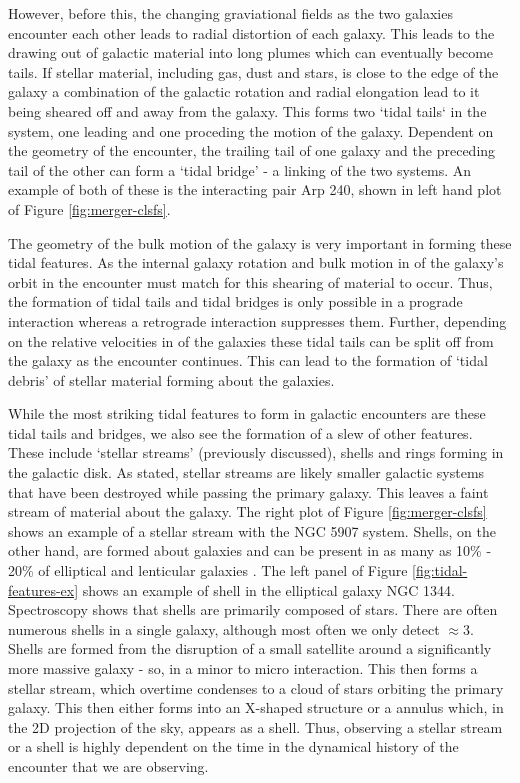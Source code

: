 However, before this, the changing graviational fields as the two galaxies encounter each other leads to radial distortion of each galaxy. This leads to the drawing out of galactic material into long plumes which can eventually become tails. If stellar material, including gas, dust and stars, is close to the edge of the galaxy a combination of the galactic rotation and radial elongation lead to it being sheared off and away from the galaxy. This forms two `tidal tails` in the system, one leading and one proceding the motion of the galaxy. Dependent on the geometry of the encounter, the trailing tail of one galaxy and the preceding tail of the other can form a `tidal bridge' - a linking of the two systems. An example of both of these is the interacting pair Arp 240, shown in left hand plot of Figure \ref{fig:merger-clsfs}. 

The geometry of the bulk motion of the galaxy is very important in forming these tidal features. As the internal galaxy rotation and bulk motion in of the galaxy's orbit in the encounter must match for this shearing of material to occur. Thus, the formation of tidal tails and tidal bridges is only possible in a prograde interaction whereas a retrograde interaction suppresses them. Further, depending on the relative velocities in of the galaxies these tidal tails can be split off from the galaxy as the encounter continues. This can lead to the formation of `tidal debris' of stellar material forming about the galaxies.

While the most striking tidal features to form in galactic encounters are these tidal tails and bridges, we also see the formation of a slew of other features. These include `stellar streams' (previously discussed), shells and rings forming in the galactic disk. As stated, stellar streams are likely smaller galactic systems that have been destroyed while passing the primary galaxy. This leaves a faint stream of material about the galaxy. The right plot of Figure \ref{fig:merger-clsfs} shows an example of a stellar stream with the NGC 5907 system. Shells, on the other hand, are formed about galaxies and can be present in as many as 10\% - 20\% of elliptical and lenticular galaxies \citep{1983ApJ...274..534M, 2013ApJ...765...28A}. The left panel of Figure \ref{fig:tidal-features-ex} shows an example of shell in the elliptical galaxy NGC 1344. Spectroscopy shows that shells are primarily composed of stars. There are often numerous shells in a single galaxy, although most often we only detect $\approx$3. Shells are formed from the disruption of a small satellite around a significantly more massive galaxy - so, in a minor to micro interaction. This then forms a stellar stream, which overtime condenses to a cloud of stars orbiting the primary galaxy. This then either forms into an X-shaped structure or a annulus which, in the 2D projection of the sky, appears as a shell. Thus, observing a stellar stream or a shell is highly dependent on the time in the dynamical history of the encounter that we are observing.

